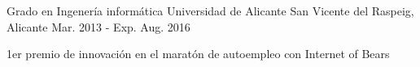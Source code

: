 

\begin{cventries}

  \cventry
    {Grado en Ingenería informática } %
    {Universidad de Alicante} %
    {San Vicente del Raspeig, Alicante} %
    {Mar. 2013 - Exp. Aug. 2016} %
    {
      \begin{cvitems} %
        \item {1er premio de innovación en el maratón de autoempleo con Internet of Bears}
      \end{cvitems}
    }

\end{cventries}
